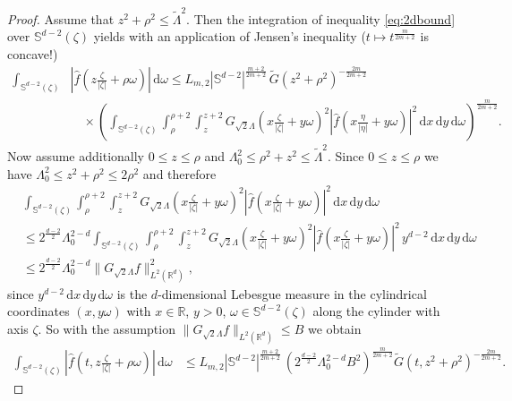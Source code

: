 \documentclass[11pt,a4paper,reqno]{amsart}
\theoremstyle{plain}
\theoremstyle{definition}
\begin{document}
\begin{proof}
	 Assume that $z^2+\rho^2\le \widetilde{\Lambda}^2$. Then the integration of inequality \eqref{eq:2dbound} over ${\mathbb{S}}^{d-2}(\zeta)$ yields with an application of Jensen's inequality ($t\mapsto t^{\frac{m}{2m+2}}$ is concave!)
	\begin{align*}
		\int_{{\mathbb{S}}^{d-2}(\zeta)} &\left|\hat{f}\left(z \tfrac{\zeta}{|\zeta|}+\rho\omega\right)\right|\, \mathrm{d}\omega \leq L_{m,2}  |{\mathbb{S}}^{d-2}|^{\frac{m+2}{2m+2}}\, \widetilde{G}\left(z^2+ \rho^2 \right)^{-\frac{2m}{2m+2}}\\
		& \quad \times \left( \int_{{\mathbb{S}}^{d-2}(\zeta)} \int_{\rho}^{\rho+2} \int_z^{z+2} G_{\sqrt{2}\Lambda}\left(x \tfrac{\zeta}{|\zeta|}+y\omega\right)^2  \left|\hat{f}\left(x\tfrac{\eta}{|\eta|}+y\omega\right)\right|^2\,\mathrm{d}x\,\mathrm{d}y \,\mathrm{d}\omega \right)^{\frac{m}{2m+2}}.
	\end{align*}
	Now assume additionally $0\leq z \leq \rho$ and $\Lambda_0^2 \leq \rho^2 + z^2 \leq \widetilde{\Lambda}^2$. Since $0\leq z \leq \rho$ we have $\Lambda_0^2 \leq z^2 + \rho^2 \leq 2 \rho^2$ and therefore
	\begin{align*}
		&\int_{{\mathbb{S}}^{d-2}(\zeta)} \int_{\rho}^{\rho+2} \int_z^{z+2} G_{\sqrt{2}\Lambda}\left(x \tfrac{\zeta}{|\zeta|}+y\omega\right)^2  \left|\hat{f}\left(x \tfrac{\zeta}{|\zeta|}+y\omega\right)\right|^2\,\mathrm{d}x\,\mathrm{d}y \,\mathrm{d}\omega \\
		&\leq 2^{\frac{d-2}{2}} \Lambda_0^{2-d} \int_{{\mathbb{S}}^{d-2}(\zeta)} \int_{\rho}^{\rho+2} \int_z^{z+2} G_{\sqrt{2}\Lambda}\left(x \tfrac{\zeta}{|\zeta|}+y\omega\right)^2  \left|\hat{f}\left(x \tfrac{\zeta}{|\zeta|}+y\omega\right)\right|^2\,y^{d-2} \,\mathrm{d}x\,\mathrm{d}y \,\mathrm{d}\omega \\
		&\leq 2^{\frac{d-2}{2}} \Lambda_0^{2-d} \|G_{\sqrt{2}\Lambda}f\|_{L^2({\mathbb{R}}^d)}^2,
	\end{align*}
	since $y^{d-2} \,\mathrm{d}x\,\mathrm{d}y \,\mathrm{d}\omega$ is the $d$-dimensional Lebesgue measure in the cylindrical coordinates $(x,y\omega)$ with $x\in {\mathbb{R}} $, $y>0$, $\omega\in {\mathbb{S}}^{d-2}(\zeta)$ along the cylinder with axis $\zeta $.
	So with the assumption $\|G_{\sqrt{2}\Lambda}f\|_{L^2({\mathbb{R}}^d)} \leq B$ we obtain
	\begin{align*}
		\int_{{\mathbb{S}}^{d-2}(\zeta)} \left|\hat{f}\left(t,z \tfrac{\zeta}{|\zeta|}+\rho\omega\right)\right|\,\mathrm{d}\omega &\leq L_{m,2}  |{\mathbb{S}}^{d-2}|^{\frac{m+2}{2m+2}}\, \left( 2^{\frac{d-2}{2}} \Lambda_0^{2-d} B^2 \right)^{\frac{m}{2m+2}} \widetilde{G}\left(t,z^2+ \rho^2 \right)^{-\frac{2m}{2m+2}}.

\end{align*}
\end{proof}
\end{document}
